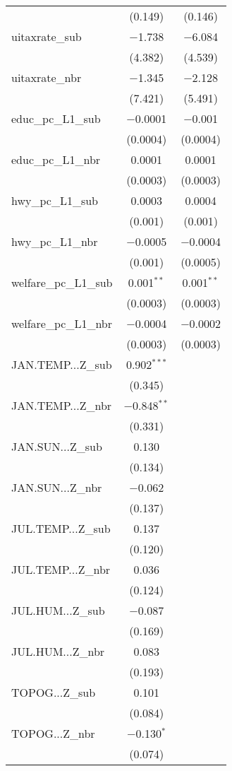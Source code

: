 \begin{table}[!htbp]
\begin{tabular}{@{\extracolsep{5pt}}lcc}
  & (0.149) & (0.146) \\ 
  uitaxrate\_sub & $-$1.738 & $-$6.084 \\ 
  & (4.382) & (4.539) \\ 
  uitaxrate\_nbr & $-$1.345 & $-$2.128 \\ 
  & (7.421) & (5.491) \\ 
  educ\_pc\_L1\_sub & $-$0.0001 & $-$0.001 \\ 
  & (0.0004) & (0.0004) \\ 
  educ\_pc\_L1\_nbr & 0.0001 & 0.0001 \\ 
  & (0.0003) & (0.0003) \\ 
  hwy\_pc\_L1\_sub & 0.0003 & 0.0004 \\ 
  & (0.001) & (0.001) \\ 
  hwy\_pc\_L1\_nbr & $-$0.0005 & $-$0.0004 \\ 
  & (0.001) & (0.0005) \\ 
  welfare\_pc\_L1\_sub & 0.001$^{**}$ & 0.001$^{**}$ \\ 
  & (0.0003) & (0.0003) \\ 
  welfare\_pc\_L1\_nbr & $-$0.0004 & $-$0.0002 \\ 
  & (0.0003) & (0.0003) \\ 
  JAN.TEMP...Z\_sub & 0.902$^{***}$ &  \\ 
  & (0.345) &  \\ 
  JAN.TEMP...Z\_nbr & $-$0.848$^{**}$ &  \\ 
  & (0.331) &  \\ 
  JAN.SUN...Z\_sub & 0.130 &  \\ 
  & (0.134) &  \\ 
  JAN.SUN...Z\_nbr & $-$0.062 &  \\ 
  & (0.137) &  \\ 
  JUL.TEMP...Z\_sub & 0.137 &  \\ 
  & (0.120) &  \\ 
  JUL.TEMP...Z\_nbr & 0.036 &  \\ 
  & (0.124) &  \\ 
  JUL.HUM...Z\_sub & $-$0.087 &  \\ 
  & (0.169) &  \\ 
  JUL.HUM...Z\_nbr & 0.083 &  \\ 
  & (0.193) &  \\ 
  TOPOG...Z\_sub & 0.101 &  \\ 
  & (0.084) &  \\ 
  TOPOG...Z\_nbr & $-$0.130$^{*}$ &  \\ 
  & (0.074) &  \\ 

\end{tabular}
\end{table}
